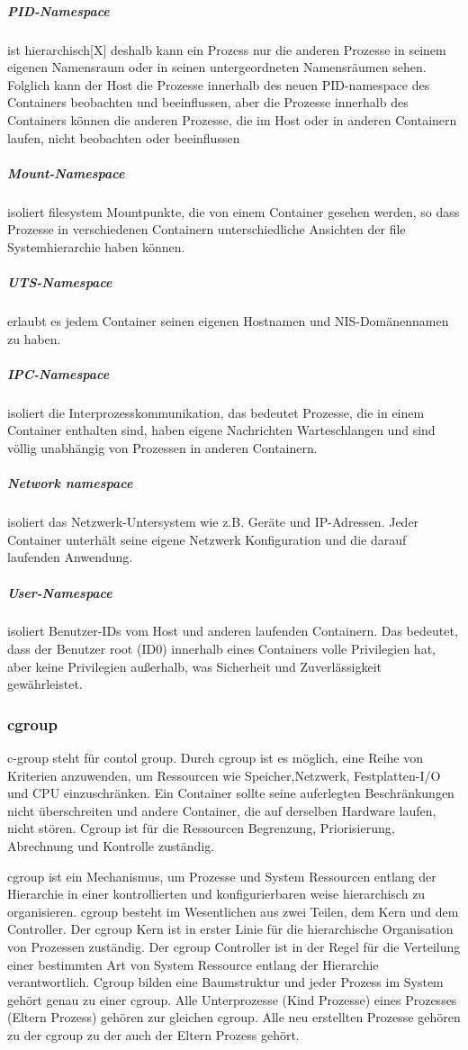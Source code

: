 \subparagraph{PID-Namespace} ist hierarchisch[X] deshalb kann ein Prozess nur die anderen Prozesse in seinem eigenen Namensraum oder in seinen untergeordneten Namensräumen sehen. Folglich kann der Host die Prozesse innerhalb des neuen PID-namespace des Containers beobachten und beeinflussen, aber die Prozesse innerhalb des Containers können die anderen Prozesse, die im Host oder in anderen Containern laufen, nicht beobachten oder beeinflussen

\subparagraph{Mount-Namespace} isoliert filesystem Mountpunkte, die von einem Container gesehen werden, so dass Prozesse in verschiedenen Containern unterschiedliche Ansichten der file Systemhierarchie haben können.

\subparagraph{UTS-Namespace} erlaubt es jedem Container seinen eigenen Hostnamen und NIS-Domänennamen zu haben.

\subparagraph{IPC-Namespace} isoliert die Interprozesskommunikation, das bedeutet Prozesse, die in einem Container enthalten sind, haben eigene Nachrichten Warteschlangen und sind völlig unabhängig von Prozessen in anderen Containern.

\subparagraph{Network namespace} isoliert das Netzwerk-Untersystem wie z.B. Geräte und IP-Adressen. Jeder Container unterhält seine eigene Netzwerk Konfiguration und die darauf laufenden Anwendung.

\subparagraph{User-Namespace} isoliert Benutzer-IDs vom Host und anderen laufenden Containern. Das bedeutet, dass der Benutzer root (ID0) innerhalb eines Containers volle Privilegien hat, aber keine Privilegien außerhalb, was Sicherheit und Zuverlässigkeit gewährleistet. \cite{Xavier2015AClouds}
	



\subsubsection{cgroup}
\glqq c-group\grqq{} steht für \glqq contol group\grqq{}. Durch cgroup ist es möglich, eine Reihe von Kriterien anzuwenden, um Ressourcen wie Speicher,Netzwerk, Festplatten-I/O und CPU einzuschränken. Ein Container sollte seine auferlegten Beschränkungen nicht überschreiten und andere Container, die auf derselben Hardware laufen, nicht stören. Cgroup ist für die Ressourcen Begrenzung, Priorisierung, Abrechnung und Kontrolle zuständig.\cite{Heo2015ControlV2} 

cgroup ist ein Mechanismus, um Prozesse und System Ressourcen entlang der Hierarchie in einer kontrollierten und konfigurierbaren weise hierarchisch zu organisieren. cgroup besteht im Wesentlichen aus zwei Teilen, dem Kern und dem Controller. Der cgroup Kern ist in erster Linie für die hierarchische Organisation von Prozessen zuständig. Der cgroup Controller ist in der Regel für die Verteilung einer bestimmten Art von System Ressource entlang der Hierarchie verantwortlich. Cgroup bilden eine Baumstruktur und jeder Prozess im System gehört genau zu einer cgroup. Alle Unterprozesse (Kind Prozesse) eines Prozesses (Eltern Prozess) gehören zur gleichen cgroup. Alle neu erstellten Prozesse gehören zu der cgroup zu der auch der Eltern Prozess gehört.


